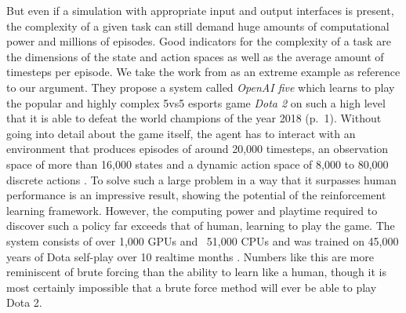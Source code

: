 \par
But even if a simulation with appropriate input and output interfaces is present, the complexity of a given task can still demand huge amounts of computational power and millions of episodes. Good indicators for the complexity of a task are the dimensions of the state and action spaces as well as the average amount of timesteps per episode. We take the work from \cite{berner2019dota} as an extreme example as reference to our argument. They propose a system called \textit{OpenAI five} which learns to play the popular and highly complex 5vs5 esports game \textit{Dota 2} on such a high level that it is able to defeat the world champions of the year 2018 (p.~1). Without going into detail about the game itself, the agent has to interact with an environment that produces episodes of around 20,000 timesteps, an observation space of more than 16,000 states and a dynamic action space of 8,000 to 80,000 discrete actions \cite[p.~3]{berner2019dota}. To solve such a large problem in a way that it surpasses human performance is an impressive result, showing the potential of the reinforcement learning framework. However, the computing power and playtime required to discover such a policy far exceeds that of human, learning to play the game. The system consists of over 1,000 GPUs and ~51,000 CPUs \cite[p.~3]{berner2019dota} and was trained on 45,000 years of Dota self-play over 10 realtime months \cite[]{OpenAI_dota}.
Numbers like this are more reminiscent of brute forcing than the ability to learn like a human, though it is most certainly impossible that a brute force method will ever be able to play Dota 2.